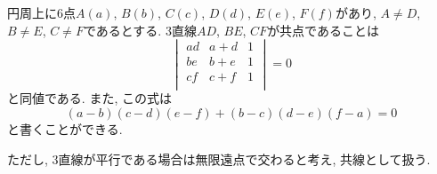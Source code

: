 %
%
\begin{bcor}\label{cor:concurrency2}
円周上に$6$点$A(a)$, $B(b)$, $C(c)$, $D(d)$, $E(e)$, $F(f)$があり, $A\neq D$, $B\neq E$, $C\neq F$であるとする.
$3$直線$AD$, $BE$, $CF$が共点であることは
\[
\begin{vmatrix}
ad&a+d&1\\
be&b+e&1\\
cf&c+f&1\\
\end{vmatrix}
=0
\]
と同値である.
また, この式は
\[
(a-b)(c-d)(e-f)+(b-c)(d-e)(f-a)=0
\]
と書くことができる.

ただし, $3$直線が平行である場合は無限遠点で交わると考え, 共線として扱う.
\end{bcor}
